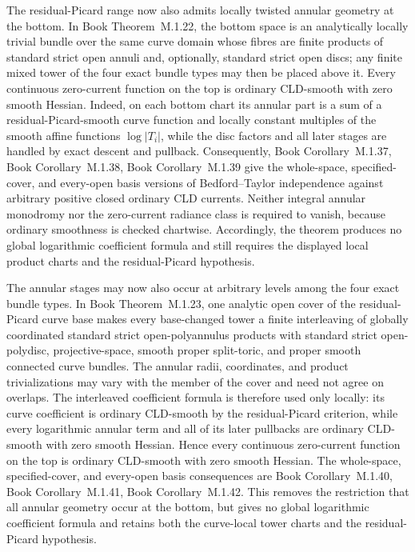 \documentclass[11pt,a4paper]{article}
\theoremstyle{definition}
\theoremstyle{remark}
\begin{document}
The residual-Picard range now also admits locally twisted annular geometry
at the bottom.  In
Book Theorem~M.1.22, the bottom
space is an analytically locally trivial bundle over the same curve domain
whose fibres are finite products of standard strict open annuli and,
optionally, standard strict open discs; any finite mixed tower of the four
exact bundle types may then be placed above it.  Every continuous
zero-current function on the top is ordinary CLD-smooth with zero smooth
Hessian.  Indeed, on each bottom chart its annular part is a sum of a
residual-Picard-smooth curve function and locally constant multiples of the
smooth affine functions \(\log|T_i|\), while the disc factors and all later
stages are handled by exact descent and pullback.  Consequently,
Book Corollary~M.1.37, Book Corollary~M.1.38, Book Corollary~M.1.39
give the whole-space, specified-cover, and every-open basis versions of
Bedford--Taylor independence against arbitrary positive closed ordinary CLD
currents.  Neither integral annular monodromy nor the zero-current radiance
class is required to vanish, because ordinary smoothness is checked
chartwise.  Accordingly, the theorem produces no global logarithmic
coefficient formula and still requires the displayed local product charts
and the residual-Picard hypothesis.

The annular stages may now also occur at arbitrary levels among the four
exact bundle types.  In
Book Theorem~M.1.23, one analytic
open cover of the residual-Picard curve base makes every base-changed tower
a finite interleaving of globally coordinated standard strict
open-polyannulus products with standard strict open-polydisc,
projective-space, smooth proper split-toric, and proper smooth connected
curve bundles.  The annular radii, coordinates, and product trivializations
may vary with the member of the cover and need not agree on overlaps.  The
interleaved coefficient formula is therefore used only locally: its curve
coefficient is ordinary CLD-smooth by the residual-Picard criterion, while
every logarithmic annular term and all of its later pullbacks are ordinary
CLD-smooth with zero smooth Hessian.  Hence every continuous zero-current
function on the top is ordinary CLD-smooth with zero smooth Hessian.  The
whole-space, specified-cover, and every-open basis consequences are
Book Corollary~M.1.40, Book Corollary~M.1.41, Book Corollary~M.1.42.
This removes the restriction that all annular geometry occur at the bottom,
but gives no global logarithmic coefficient formula and retains both the
curve-local tower charts and the residual-Picard hypothesis.
\end{document}
